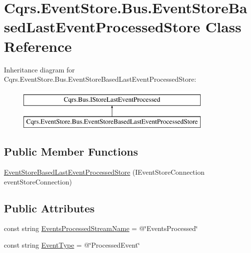 \hypertarget{classCqrs_1_1EventStore_1_1Bus_1_1EventStoreBasedLastEventProcessedStore}{}\section{Cqrs.\+Event\+Store.\+Bus.\+Event\+Store\+Based\+Last\+Event\+Processed\+Store Class Reference}
\label{classCqrs_1_1EventStore_1_1Bus_1_1EventStoreBasedLastEventProcessedStore}
Inheritance diagram for Cqrs.\+Event\+Store.\+Bus.\+Event\+Store\+Based\+Last\+Event\+Processed\+Store\+:\begin{figure}[H]
\begin{center}
\leavevmode
\includegraphics[height=2.000000cm]{classCqrs_1_1EventStore_1_1Bus_1_1EventStoreBasedLastEventProcessedStore}
\end{center}
\end{figure}
\subsection*{Public Member Functions}
\begin{DoxyCompactItemize}
\item 
\hyperlink{classCqrs_1_1EventStore_1_1Bus_1_1EventStoreBasedLastEventProcessedStore_a54dc3860c38026fd298bd204e3079490_a54dc3860c38026fd298bd204e3079490}{Event\+Store\+Based\+Last\+Event\+Processed\+Store} (I\+Event\+Store\+Connection event\+Store\+Connection)
\end{DoxyCompactItemize}
\subsection*{Public Attributes}
\begin{DoxyCompactItemize}
\item 
const string \hyperlink{classCqrs_1_1EventStore_1_1Bus_1_1EventStoreBasedLastEventProcessedStore_aa3125d75a64df58026e0fd785f99bfff_aa3125d75a64df58026e0fd785f99bfff}{Events\+Processed\+Stream\+Name} = @\char`\"{}Events\+Processed\char`\"{}
\item 
const string \hyperlink{classCqrs_1_1EventStore_1_1Bus_1_1EventStoreBasedLastEventProcessedStore_a63b4ae4f14e782d605aff1bd214db3f1_a63b4ae4f14e782d605aff1bd214db3f1}{Event\+Type} = @\char`\"{}Processed\+Event\char`\"{}
\end{DoxyCompactItemize}
